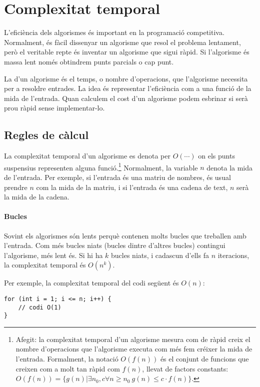 \chapter{Complexitat temporal}


L'eficiència dels algorismes és important en
la programació competitiva.
Normalment, és fàcil dissenyar un algorisme
que resol el problema lentament,
però el veritable repte és inventar un
algorisme que sigui ràpid.
Si l'algorisme és massa lent només obtindrem
punts parcials o cap punt.

La  d'un algorisme
és el temps, o nombre d'operacions, que l'algorisme necessita
per a resoldre entrades.
La idea és representar l'eficiència
com a una funció de la mida de l'entrada.
Quan calculem el cost d'un algorisme
podem esbrinar si serà prou ràpid
sense implementar-lo.

\section{Regles de càlcul}

La complexitat temporal d'un algorisme es denota per
$O(\cdots)$ on els punts suspensius representen alguna
funció.\footnote{Afegit: la complexitat temporal
d'un algorisme mesura com de ràpid creix el nombre
d'operacions que l'algorisme executa com més fem créixer
la mida de l'entrada. Formalment, la notació
$O(f(n))$ és el conjunt de funcions
que creixen com a molt tan ràpid com $f(n)$, llevat de
factors constants:
$O(f(n))=\{ g(n) | \exists n_0, c \forall n\ge n_0 \
g(n) \le c\cdot f(n) \}$.}
Normalment, la variable $n$ denota la mida de l'entrada.
Per exemple, si l'entrada és una matriu de
nombres, és usual prendre $n$ com la mida de la matriu,
i si l'entrada és una cadena de text, $n$ serà la mida
de la cadena.

\subsubsection*{Bucles}

Sovint els algorismes són lents
perquè contenen molts bucles que treballen amb l'entrada.
Com més bucles niats (bucles dintre d'altres bucles)
contingui l'algorisme, més lent és.
Si hi ha $k$ bucles niats, i cadascun d'ells fa $n$ iteracions,
la complexitat temporal és $O(n^k)$.

Per exemple, la complexitat temporal del codi següent és $O(n)$:
\begin{lstlisting}
for (int i = 1; i <= n; i++) {
    // codi O(1)
}
\end{lstlisting}

